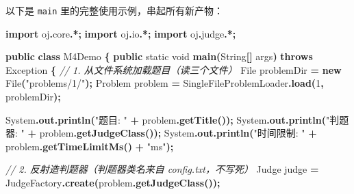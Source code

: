 \documentclass[
  11pt,
]{ctexart}
\newenvironment{Shaded}{\begin{snugshade}}{\end{snugshade}}
\newcommand{\BuiltInTok}[1]{#1}
\newcommand{\CommentTok}[1]{\textcolor[rgb]{0.56,0.35,0.01}{\textit{#1}}}
\newcommand{\DataTypeTok}[1]{\textcolor[rgb]{0.13,0.29,0.53}{#1}}
\newcommand{\DecValTok}[1]{\textcolor[rgb]{0.00,0.00,0.81}{#1}}
\newcommand{\FunctionTok}[1]{\textcolor[rgb]{0.13,0.29,0.53}{\textbf{#1}}}
\newcommand{\ImportTok}[1]{#1}
\newcommand{\KeywordTok}[1]{\textcolor[rgb]{0.13,0.29,0.53}{\textbf{#1}}}
\newcommand{\NormalTok}[1]{#1}
\newcommand{\OperatorTok}[1]{\textcolor[rgb]{0.81,0.36,0.00}{\textbf{#1}}}
\newcommand{\StringTok}[1]{\textcolor[rgb]{0.31,0.60,0.02}{#1}}
\begin{document}
以下是 \texttt{main} 里的完整使用示例，串起所有新产物：

\begin{Shaded}
\begin{Highlighting}[]
\KeywordTok{import} \ImportTok{oj}\OperatorTok{.}\ImportTok{core}\OperatorTok{.*;}
\KeywordTok{import} \ImportTok{oj}\OperatorTok{.}\ImportTok{io}\OperatorTok{.*;}
\KeywordTok{import} \ImportTok{oj}\OperatorTok{.}\ImportTok{judge}\OperatorTok{.*;}

\KeywordTok{public} \KeywordTok{class}\NormalTok{ M4Demo }\OperatorTok{\{}
    \KeywordTok{public} \DataTypeTok{static} \DataTypeTok{void} \FunctionTok{main}\OperatorTok{(}\BuiltInTok{String}\OperatorTok{[]}\NormalTok{ args}\OperatorTok{)} \KeywordTok{throws} \BuiltInTok{Exception} \OperatorTok{\{}
        \CommentTok{// 1. 从文件系统加载题目（读三个文件）}
        \BuiltInTok{File}\NormalTok{ problemDir }\OperatorTok{=} \KeywordTok{new} \BuiltInTok{File}\OperatorTok{(}\StringTok{"problems/1/"}\OperatorTok{);}
\NormalTok{        Problem problem }\OperatorTok{=}\NormalTok{ SingleFileProblemLoader}\OperatorTok{.}\FunctionTok{load}\OperatorTok{(}\DecValTok{1}\OperatorTok{,}\NormalTok{ problemDir}\OperatorTok{);}

        \BuiltInTok{System}\OperatorTok{.}\FunctionTok{out}\OperatorTok{.}\FunctionTok{println}\OperatorTok{(}\StringTok{"题目: "} \OperatorTok{+}\NormalTok{ problem}\OperatorTok{.}\FunctionTok{getTitle}\OperatorTok{());}
        \BuiltInTok{System}\OperatorTok{.}\FunctionTok{out}\OperatorTok{.}\FunctionTok{println}\OperatorTok{(}\StringTok{"判题器: "} \OperatorTok{+}\NormalTok{ problem}\OperatorTok{.}\FunctionTok{getJudgeClass}\OperatorTok{());}
        \BuiltInTok{System}\OperatorTok{.}\FunctionTok{out}\OperatorTok{.}\FunctionTok{println}\OperatorTok{(}\StringTok{"时间限制: "} \OperatorTok{+}\NormalTok{ problem}\OperatorTok{.}\FunctionTok{getTimeLimitMs}\OperatorTok{()} \OperatorTok{+} \StringTok{"ms"}\OperatorTok{);}

        \CommentTok{// 2. 反射造判题器（判题器类名来自 config.txt，不写死）}
\NormalTok{        Judge judge }\OperatorTok{=}\NormalTok{ JudgeFactory}\OperatorTok{.}\FunctionTok{create}\OperatorTok{(}\NormalTok{problem}\OperatorTok{.}\FunctionTok{getJudgeClass}\OperatorTok{());}


\end{Highlighting}
\end{Shaded}
\end{document}
